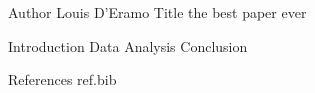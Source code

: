 Author Louis D'Eramo
Title the best paper ever

Introduction
Data
Analysis
Conclusion 

References 
ref.bib